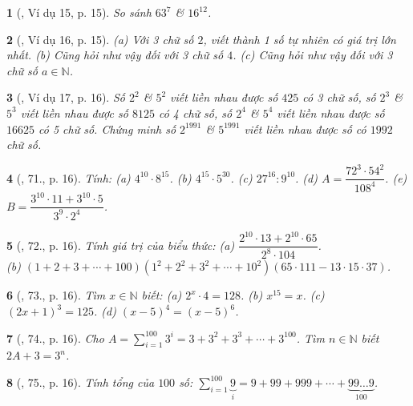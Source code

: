 \documentclass{article}
\newtheorem{baitoan}{}
\begin{document}
\begin{baitoan}[\cite{Binh_Toan_6_tap_1}, Ví dụ 15, p. 15]
	So sánh $63^7$ \& $16^{12}$.
\end{baitoan}

\begin{baitoan}[\cite{Binh_Toan_6_tap_1}, Ví dụ 16, p. 15]
	(a) Với 3 chữ số $2$, viết thành 1 số tự nhiên có giá trị lớn nhất. (b) Cũng hỏi như vậy đối với 3 chữ số $4$. (c) Cũng hỏi như vậy đối với 3 chữ số $a\in\mathbb{N}$.
\end{baitoan}

\begin{baitoan}[\cite{Binh_Toan_6_tap_1}, Ví dụ 17, p. 16]
	Số $2^2$ \& $5^2$ viết liền nhau được số $425$ có 3 chữ số, số $2^3$ \& $5^3$ viết liền nhau được số $8125$ có 4 chữ số, số $2^4$ \& $5^4$ viết liền nhau được số $16625$ có 5 chữ số. Chứng minh số $2^{1991}$ \& $5^{1991}$ viết liền nhau được số có $1992$ chữ số.
\end{baitoan}

\begin{baitoan}[\cite{Binh_Toan_6_tap_1}, 71., p. 16]
	Tính: (a) $4^{10}\cdot8^{15}$. (b) $4^{15}\cdot5^{30}$. (c) $27^{16}:9^{10}$. (d) $A = \dfrac{72^3\cdot54^2}{108^4}$. (e) $B = \dfrac{3^{10}\cdot11 + 3^{10}\cdot5}{3^9\cdot2^4}$.
\end{baitoan}

\begin{baitoan}[\cite{Binh_Toan_6_tap_1}, 72., p. 16]
	Tính giá trị của biểu thức: (a) $\dfrac{2^{10}\cdot13 + 2^{10}\cdot65}{2^8\cdot104}$.\\(b) $(1 + 2 + 3 + \cdots + 100)(1^2 + 2^2 + 3^2 + \cdots + 10^2)(65\cdot111 - 13\cdot15\cdot37)$.
\end{baitoan}

\begin{baitoan}[\cite{Binh_Toan_6_tap_1}, 73., p. 16]
	Tìm $x\in\mathbb{N}$ biết: (a) $2^x\cdot4 = 128$. (b) $x^{15} = x$. (c) $(2x + 1)^3 = 125$. (d) $(x - 5)^4 = (x - 5)^6$.
\end{baitoan}

\begin{baitoan}[\cite{Binh_Toan_6_tap_1}, 74., p. 16]
	Cho $A = \sum_{i=1}^{100} 3^i = 3 + 3^2 + 3^3 + \cdots + 3^{100}$. Tìm $n\in\mathbb{N}$ biết $2A + 3 = 3^n$.
\end{baitoan}

\begin{baitoan}[\cite{Binh_Toan_6_tap_1}, 75., p. 16]
	Tính tổng của $100$ số: $\sum_{i=1}^{100} \underbrace{9}_i = 9+ 99 + 999 + \cdots + \underbrace{99\ldots9}_{100}$.
\end{baitoan}
\end{document}
